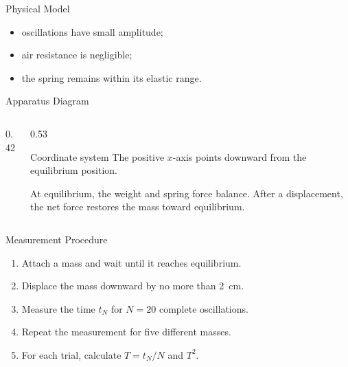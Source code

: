 \begin{frame}{Physical Model}
  \vspace{0.8em}
  \begin{itemize}
    \item oscillations have small amplitude;
    \item air resistance is negligible;
    \item the spring remains within its elastic range.
  \end{itemize}
\end{frame}

\begin{frame}{Apparatus Diagram}
  \begin{columns}[c,onlytextwidth]
    \begin{column}{0.42\textwidth}
      \centering
      \resizebox{0.72\linewidth}{!}{}
    \end{column}
    \begin{column}{0.53\textwidth}
      \begin{block}{Coordinate system}
        The positive $x$-axis points downward from the equilibrium position.
      \end{block}
      \vspace{0.5em}
      At equilibrium, the weight and spring force balance. After a
      displacement, the net force restores the mass toward equilibrium.
    \end{column}
  \end{columns}
\end{frame}

\begin{frame}{Measurement Procedure}
  \begin{enumerate}
    \item Attach a mass and wait until it reaches equilibrium.
    \item Displace the mass downward by no more than \SI{2}{\centi\metre}.
    \item Measure the time $t_N$ for $N=20$ complete oscillations.
    \item Repeat the measurement for five different masses.
    \item For each trial, calculate $T=t_N/N$ and $T^2$.
  \end{enumerate}
\end{frame}

